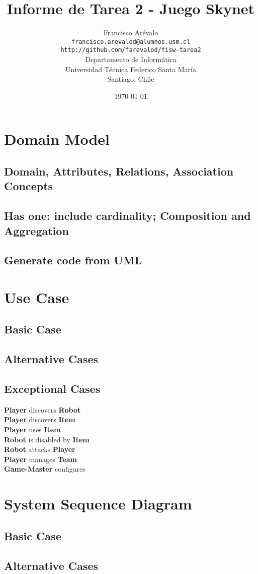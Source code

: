 \documentclass{article}
\begin{document}
\title{Informe de Tarea 2 - Juego Skynet}
\author{Francisco Ar\'evalo\\
  \texttt{francisco.arevalod@alumnos.usm.cl}\\
  \texttt{http://github.com/farevalod/fisw-tarea2}\\
  \vspace{10mm}
  Departamento de Inform\'atica\\
  Universidad T\'ecnica Federico Santa Mar\'ia\\
  Santiago, Chile}
\date{\today}
\maketitle
\tableofcontents
\section{Domain Model}
\subsection{Domain, Attributes, Relations, Association Concepts}
\subsection{Has one: include cardinality; Composition and Aggregation}
\subsection{Generate code from UML}
\section{Use Case}
\subsection{Basic Case}
\subsection{Alternative Cases}
\subsection{Exceptional Cases}
\textbf{Player} discovers \textbf{Robot}\\
\textbf{Player} discovers \textbf{Item}\\
\textbf{Player} uses \textbf{Item}\\
\textbf{Robot} is disabled by \textbf{Item}\\
\textbf{Robot} attacks \textbf{Player}\\
\textbf{Player} manages \textbf{Team}\\
\textbf{Game-Master} configures\\
\section{System Sequence Diagram}
\subsection{Basic Case}
\subsection{Alternative Cases}
\end{document}
